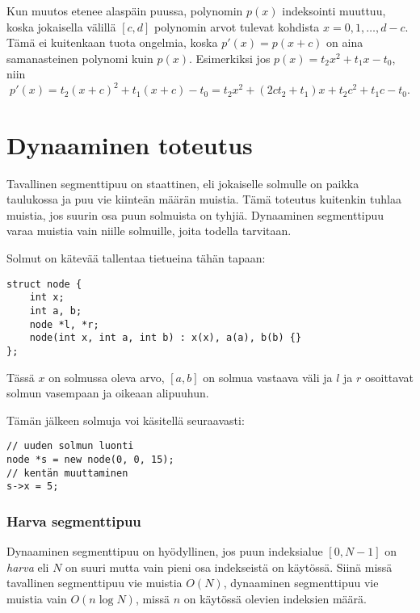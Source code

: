 Kun muutos etenee alaspäin puussa,
polynomin $p(x)$ indeksointi muuttuu,
koska jokaisella välillä $[c,d]$
polynomin arvot tulevat kohdista $x=0,1,\ldots,d-c$.
Tämä ei kuitenkaan tuota ongelmia,
koska $p'(x)=p(x+c)$ on aina
samanasteinen polynomi kuin $p(x)$.
Esimerkiksi jos $p(x)=t_2 x^2+t_1 x-t_0$, niin
\[p'(x)=t_2(x+c)^2+t_1(x+c)-t_0=t_2 x^2 + (2ct_2+t_1)x+t_2c^2+t_1c-t_0.\]

\section{Dynaaminen toteutus}

Tavallinen segmenttipuu on staattinen,
eli jokaiselle solmulle on paikka taulukossa
ja puu vie kiinteän määrän muistia.
Tämä toteutus kuitenkin tuhlaa muistia,
jos suurin osa puun solmuista on tyhjiä.
Dynaaminen segmenttipuu varaa muistia vain
niille solmuille, joita todella tarvitaan.

Solmut on kätevää tallentaa tietueina tähän tapaan:

\begin{lstlisting}
struct node {
    int x;
    int a, b;
    node *l, *r;
    node(int x, int a, int b) : x(x), a(a), b(b) {}
};
\end{lstlisting}
Tässä $x$ on solmussa oleva arvo,
$[a,b]$ on solmua vastaava väli
ja $l$ ja $r$ osoittavat
solmun vasempaan ja oikeaan alipuuhun.

Tämän jälkeen solmuja voi käsitellä seuraavasti:

\begin{lstlisting}
// uuden solmun luonti
node *s = new node(0, 0, 15);
// kentän muuttaminen
s->x = 5;
\end{lstlisting}

\subsubsection{Harva segmenttipuu}

Dynaaminen segmenttipuu on hyödyllinen,
jos puun indeksialue $[0,N-1]$ on \textit{harva}
eli $N$ on suuri mutta vain
pieni osa indekseistä on käytössä.
Siinä missä tavallinen segmenttipuu 
vie muistia $O(N)$,
dynaaminen segmenttipuu vie muistia
vain $O(n \log N)$, missä $n$ on
käytössä olevien indeksien määrä.

